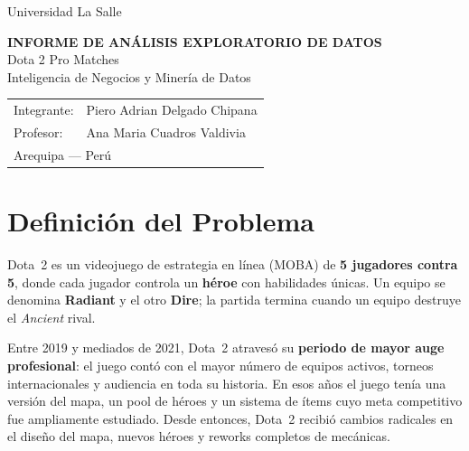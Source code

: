 \documentclass[12pt,a4paper]{article}
\begin{document}
\begin{titlepage}
  \thispagestyle{empty}
  \begin{flushleft}
    Universidad La Salle\\
  \end{flushleft}
  \vspace*{\fill}
  \begin{center}
    {\Large\bfseries INFORME DE AN\'ALISIS EXPLORATORIO DE DATOS}\\[1.2em]
    {\Large Dota 2 Pro Matches}\\[1.5em]
    {\normalsize Inteligencia de Negocios y Miner\'ia de Datos}
  \end{center}
  \vspace*{\fill}
  \begin{flushright}
    \begin{tabular}{ll}
      Integrante: & Piero Adrian Delgado Chipana \\[0.4em]
      Profesor:   & Ana Maria Cuadros Valdivia   \\[0.4em]
      \multicolumn{2}{l}{Arequipa --- Per\'u}
    \end{tabular}
  \end{flushright}
\end{titlepage}

\thispagestyle{fancy}
\renewcommand{\contentsname}{\'Indice de Contenidos}
\tableofcontents
\newpage

\section{Definici\'on del Problema}

Dota~2 es un videojuego de estrategia en l\'inea (MOBA) de \textbf{5 jugadores
contra 5}, donde cada jugador controla un \textbf{h\'eroe} con habilidades
\'unicas. Un equipo se denomina \textbf{Radiant} y el otro \textbf{Dire}; la
partida termina cuando un equipo destruye el \textit{Ancient} rival.

Entre 2019 y mediados de 2021, Dota~2 atraves\'o su \textbf{periodo de mayor
auge profesional}: el juego cont\'o con el mayor n\'umero de equipos activos,
torneos internacionales y audiencia en toda su historia. En esos a\~nos el
juego ten\'ia una versi\'on del mapa, un pool de h\'eroes y un sistema de \'items
cuyo meta competitivo fue ampliamente estudiado. Desde entonces, Dota~2 recibi\'o
cambios radicales en el dise\~no del mapa, nuevos h\'eroes y reworks completos de
mec\'anicas.
\end{document}
